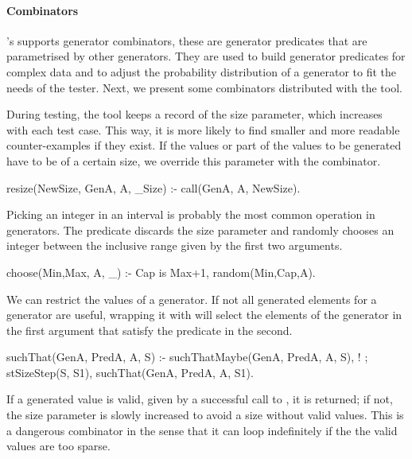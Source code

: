 \paragraph{\bf Combinators}

\plqc{}'s supports generator combinators, these are generator predicates that are
parametrised by other generators.
%
They are used to build generator predicates for complex data and to
adjust the probability distribution of a generator to fit the needs of
the tester.
%
Next, we present some
combinators distributed with the tool.


During testing, the tool keeps a record of the size parameter, which
increases with each test case.
%
This way, it is more likely to find smaller and more readable
counter-examples if they exist.
%
If the values or part of the values to be generated have to be of a
certain size, we override this parameter with the 
combinator.
%
\begin{yapcode}
 resize(NewSize, GenA, A, _Size) :- call(GenA, A, NewSize).
\end{yapcode}


Picking an integer in an interval is probably the most common operation
in generators.
%
The  predicate discards the size parameter and randomly
chooses an integer between the inclusive range given by the first two
arguments.
%
\begin{yapcode}
 choose(Min,Max, A, _) :- Cap is Max+1, random(Min,Cap,A).
\end{yapcode}


We can restrict the values of a generator. %
%
If not all generated elements for a generator are useful, wrapping it
with  will select the elements of the generator in the
first argument that satisfy the predicate in the second.
%
\begin{yapcode}
 suchThat(GenA, PredA, A, S) :- suchThatMaybe(GenA, PredA, A, S), !
   ; stSizeStep(S, S1), suchThat(GenA, PredA, A, S1).
\end{yapcode}
%
If a generated value is valid, given by a successful call to
, it is returned; if not, the size parameter is
slowly increased to avoid a size without valid values.
%
This is a dangerous combinator in the sense that it can loop
indefinitely  if the the valid values %
are too sparse.
                                                        

